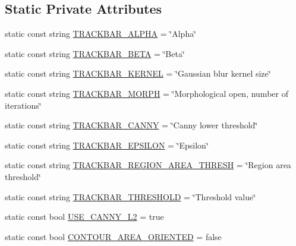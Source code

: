 \subsection*{Static Private Attributes}
\begin{DoxyCompactItemize}
\item 
static const string \hyperlink{classmultiscale_1_1analysis_1_1RegionDetector_a5513e029d4d4cf249aa40364489f7a85}{T\-R\-A\-C\-K\-B\-A\-R\-\_\-\-A\-L\-P\-H\-A} = \char`\"{}Alpha\char`\"{}
\item 
static const string \hyperlink{classmultiscale_1_1analysis_1_1RegionDetector_a79d7878ed55bf12a87637896a1f44e37}{T\-R\-A\-C\-K\-B\-A\-R\-\_\-\-B\-E\-T\-A} = \char`\"{}Beta\char`\"{}
\item 
static const string \hyperlink{classmultiscale_1_1analysis_1_1RegionDetector_a79b72da59c92b368fb7894fe1f424e00}{T\-R\-A\-C\-K\-B\-A\-R\-\_\-\-K\-E\-R\-N\-E\-L} = \char`\"{}Gaussian blur kernel size\char`\"{}
\item 
static const string \hyperlink{classmultiscale_1_1analysis_1_1RegionDetector_a0358affd40f13327b10447b7fe938338}{T\-R\-A\-C\-K\-B\-A\-R\-\_\-\-M\-O\-R\-P\-H} = \char`\"{}Morphological open, number of iterations\char`\"{}
\item 
static const string \hyperlink{classmultiscale_1_1analysis_1_1RegionDetector_a8c1c5cde2b7d42ddce44b7f8208f07cc}{T\-R\-A\-C\-K\-B\-A\-R\-\_\-\-C\-A\-N\-N\-Y} = \char`\"{}Canny lower threshold\char`\"{}
\item 
static const string \hyperlink{classmultiscale_1_1analysis_1_1RegionDetector_aa3f0755a58457592ac027b42576bd312}{T\-R\-A\-C\-K\-B\-A\-R\-\_\-\-E\-P\-S\-I\-L\-O\-N} = \char`\"{}Epsilon\char`\"{}
\item 
static const string \hyperlink{classmultiscale_1_1analysis_1_1RegionDetector_a6a2711f5cabb3af04a969fe38e1ef473}{T\-R\-A\-C\-K\-B\-A\-R\-\_\-\-R\-E\-G\-I\-O\-N\-\_\-\-A\-R\-E\-A\-\_\-\-T\-H\-R\-E\-S\-H} = \char`\"{}Region area threshold\char`\"{}
\item 
static const string \hyperlink{classmultiscale_1_1analysis_1_1RegionDetector_a7548c716410a4cb88cb41498de6b509c}{T\-R\-A\-C\-K\-B\-A\-R\-\_\-\-T\-H\-R\-E\-S\-H\-O\-L\-D} = \char`\"{}Threshold value\char`\"{}
\item 
static const bool \hyperlink{classmultiscale_1_1analysis_1_1RegionDetector_a6a8c4f7b9a6bc40ec6de940f53943772}{U\-S\-E\-\_\-\-C\-A\-N\-N\-Y\-\_\-\-L2} = true
\item 
static const bool \hyperlink{classmultiscale_1_1analysis_1_1RegionDetector_ab1fdebf0daaae6f2bb1fe4770479116f}{C\-O\-N\-T\-O\-U\-R\-\_\-\-A\-R\-E\-A\-\_\-\-O\-R\-I\-E\-N\-T\-E\-D} = false

\end{DoxyCompactItemize}
